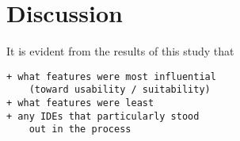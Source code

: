 \section{Discussion}
\label{sec:discussion}

It is evident from the results of this study that 
\begin{verbatim}
+ what features were most influential
    (toward usability / suitability)
+ what features were least
+ any IDEs that particularly stood
    out in the process
\end{verbatim}
